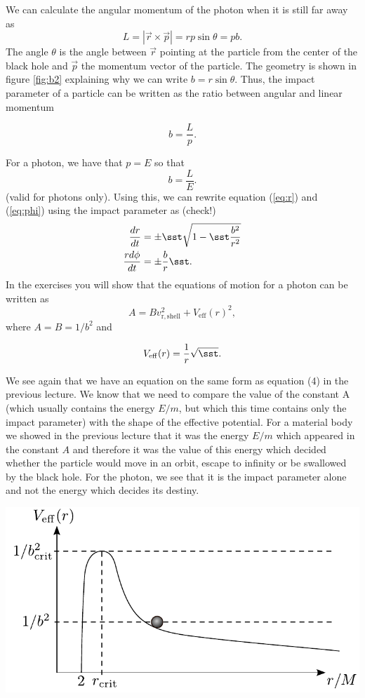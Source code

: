 {\begin{multicols}{2}
We can calculate the angular momentum of the photon when it is still far away as
\[
L=|\vec{r}\times\vec{p}|=rp\sin{\theta}=pb.
\]
The angle $\theta$ is the angle between $\vec{r}$ pointing at the particle from the center of the black hole and $\vec{p}$ the momentum vector of the particle. The geometry is shown in figure \ref{fig:b2} explaining why we can write $b=r\sin{\theta}$. Thus, the impact parameter of a particle can be written as the ratio between angular and linear momentum
\begin{formbox}
\[
b=\frac{L}{p}.
\]
\end{formbox}
For a photon, we have that $p=E$ so that
\[
b=\frac{L}{E}.
\]
(valid for photons only). Using this, we can rewrite equation (\ref{eq:r}) and (\ref{eq:phi}) using the impact parameter as (check!)
\begin{align}
\label{eq:r2}
\frac{dr}{dt}&=\pm\sst\sqrt{1-\sst\frac{b^2}{r^2}}\\
\frac{rd\phi}{dt}&=\pm\frac{b}{r}\sst.
\end{align}
In the exercises you will show that the equations of motion for a photon can be written as 
\[
A=Bv_\mathrm{r,shell}^2+V_\mathrm{eff}(r)^2,
\]
where $A=B=1/b^2$ and 
\begin{formbox}
\[
V_\mathrm{eff}(r)=\frac{1}{r}\sqrt{\sst}.
\]
\end{formbox}
We see again that we have an equation on the same form as equation (4) in the previous lecture. We know that we need to compare the value of the constant A (which usually contains the energy $E/m$, but which this time contains only the impact parameter) with the shape of the effective potential. For a material body we showed in the previous lecture that it was the energy $E/m$ which appeared in the constant $A$ and therefore it was the value of this energy which decided whether the particle would move in an orbit, escape to infinity or be swallowed by the black hole. For the photon, we see that it is the impact parameter alone and not the energy which decides its destiny.


\begin{Figure}
\centering
\includegraphics[width=\textwidth]{fig_18-3.pdf}
\end{Figure}



\end{multicols}}
